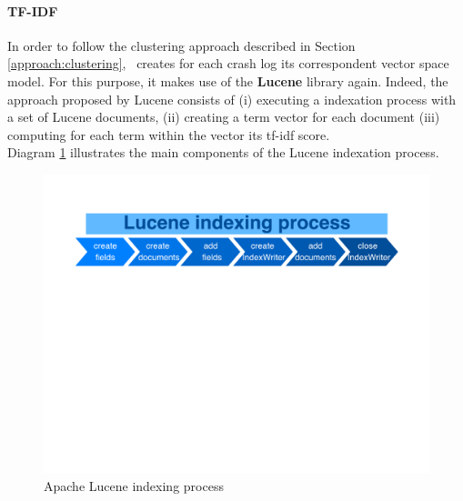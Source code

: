 \paragraph{TF-IDF}
In order to follow the clustering approach described in Section \ref{approach:clustering}, \toolname\ creates for each crash log its correspondent vector space model. 
For this purpose, it makes use of the \textbf{Lucene} library again.
Indeed, the approach proposed by Lucene consists of (i) executing a indexation process with a set of Lucene documents, (ii) creating a term vector for each document (iii) computing for each term within the vector its tf-idf score. \\ 
Diagram \ref{fig: indexingprocess} illustrates the main components of the Lucene indexation process.
\begin{figure}[tb]
\centering 
\includegraphics[width=\columnwidth]{diagrams/indexingProcess} 
\caption{Apache Lucene indexing process}
\label{fig: indexingprocess}
\end{figure}

